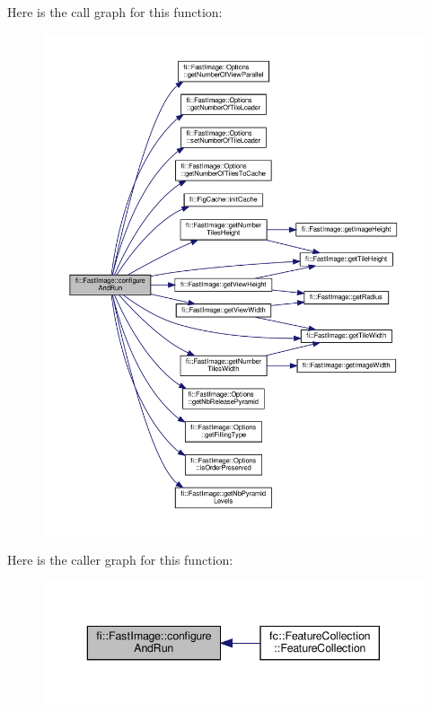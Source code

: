 Here is the call graph for this function\+:
\nopagebreak
\begin{figure}[H]
\begin{center}
\leavevmode
\includegraphics[width=350pt]{dc/d6b/classfi_1_1FastImage_aa2ae5e5498f57462abd876108a55475c_cgraph}
\end{center}
\end{figure}
Here is the caller graph for this function\+:
\nopagebreak
\begin{figure}[H]
\begin{center}
\leavevmode
\includegraphics[width=343pt]{dc/d6b/classfi_1_1FastImage_aa2ae5e5498f57462abd876108a55475c_icgraph}
\end{center}
\end{figure}
\mbox{\label{classfi_1_1FastImage_af123b9f6554040faab14dcb0a06e2b84}} 
